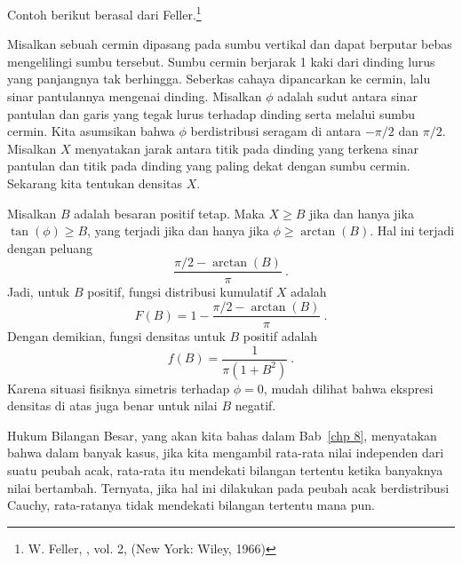 Contoh berikut berasal dari Feller.\footnote{W. Feller,  , vol. 2, (New York: Wiley, 1966)}
\begin{example}\label{exam 5.20.5}
Misalkan sebuah cermin dipasang pada sumbu vertikal dan dapat berputar bebas
mengelilingi sumbu tersebut.  Sumbu cermin berjarak 1 kaki dari dinding lurus yang
panjangnya tak berhingga.  Seberkas cahaya dipancarkan ke cermin, lalu sinar
pantulannya mengenai dinding.  Misalkan $\phi$ adalah sudut antara sinar pantulan dan
garis yang tegak lurus terhadap dinding serta melalui sumbu cermin.  Kita asumsikan
bahwa $\phi$ berdistribusi seragam di antara $-\pi/2$ dan $\pi/2$.  Misalkan $X$
menyatakan jarak antara titik pada dinding yang terkena sinar pantulan dan titik pada
dinding yang paling dekat dengan sumbu cermin.  Sekarang kita tentukan densitas $X$.
\par
Misalkan $B$ adalah besaran positif tetap.  Maka $X \ge B$ jika dan hanya jika
$\tan(\phi) \ge B$, yang terjadi jika dan hanya jika $\phi \ge \arctan(B)$.  Hal ini
terjadi dengan peluang
$$\frac{\pi/2 - \arctan(B)}{\pi}\ .$$
Jadi, untuk $B$ positif, fungsi distribusi kumulatif $X$ adalah
$$F(B) = 1 - \frac{\pi/2 - \arctan(B)}{\pi}\ .$$
Dengan demikian, fungsi densitas untuk $B$ positif adalah
$$f(B) = \frac{1}{\pi (1 + B^2)}\ .$$
Karena situasi fisiknya simetris terhadap $\phi = 0$, mudah dilihat bahwa ekspresi
densitas di atas juga benar untuk nilai $B$ negatif.
\par
Hukum Bilangan Besar, yang akan kita bahas dalam Bab~\ref{chp 8}, menyatakan bahwa
dalam banyak kasus, jika kita mengambil rata-rata nilai independen dari suatu peubah
acak, rata-rata itu mendekati bilangan tertentu ketika banyaknya nilai bertambah.
Ternyata, jika hal ini dilakukan pada peubah acak berdistribusi Cauchy, rata-ratanya
tidak mendekati bilangan tertentu mana pun.
\end{example}

